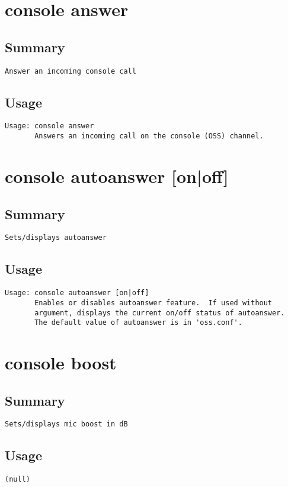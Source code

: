 \section{console answer}
\subsection{Summary}
\begin{verbatim}
Answer an incoming console call
\end{verbatim}
\subsection{Usage}
\begin{verbatim}
Usage: console answer
       Answers an incoming call on the console (OSS) channel.

\end{verbatim}


\section{console autoanswer [on|off]}
\subsection{Summary}
\begin{verbatim}
Sets/displays autoanswer
\end{verbatim}
\subsection{Usage}
\begin{verbatim}
Usage: console autoanswer [on|off]
       Enables or disables autoanswer feature.  If used without
       argument, displays the current on/off status of autoanswer.
       The default value of autoanswer is in 'oss.conf'.

\end{verbatim}


\section{console boost}
\subsection{Summary}
\begin{verbatim}
Sets/displays mic boost in dB
\end{verbatim}
\subsection{Usage}
\begin{verbatim}
(null)
\end{verbatim}


